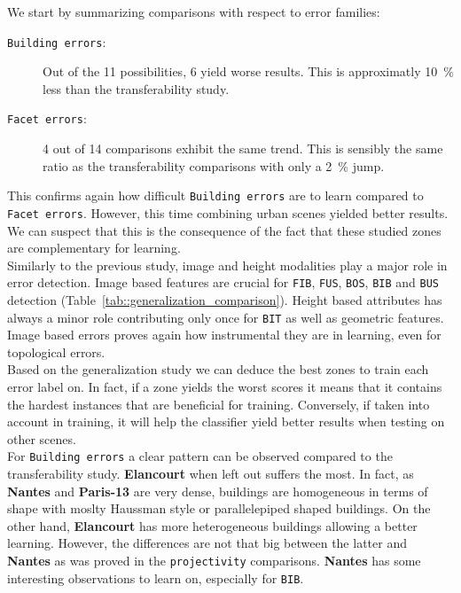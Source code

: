        We start by summarizing comparisons with respect to error families:
        \begin{description}
            \item[\texttt{Building errors}:] Out of the 11 possibilities, 6 yield worse results.
                    This is approximatly \SI{10}{\percent} less than the transferability study.
            \item[\texttt{Facet errors}:] 4 out of 14 comparisons exhibit the same trend.
                    This is sensibly the same ratio as the transferability comparisons with only a \SI{2}{\percent} jump.
        \end{description}
        This confirms again how difficult \texttt{Building errors} are to learn compared to \texttt{Facet errors}.
        However, this time combining urban scenes yielded better results.
        We can suspect that this is the consequence of the fact that these studied zones are complementary for learning.\\
        
        Similarly to the previous study, image and height modalities play a major role in error detection.
        Image based features are crucial for \texttt{FIB}, \texttt{FUS}, \texttt{BOS}, \texttt{BIB} and \texttt{BUS} detection (Table~\ref{tab::generalization_comparison}).
        Height based attributes has always a minor role contributing only once for \texttt{BIT} as well as geometric features.
        Image based errors proves again how instrumental they are in learning, even for topological errors.\\
        
        Based on the generalization study we can deduce the best zones to train each error label on.
        In fact, if a zone yields the worst scores it means that it contains the hardest instances that are beneficial for training.
        Conversely, if taken into account in training, it will help the classifier yield better results when testing on other scenes.\\

        For \texttt{Building errors} a clear pattern can be observed compared to the transferability study.
        \textbf{Elancourt} when left out suffers the most.
        In fact, as \textbf{Nantes} and \textbf{Paris-13} are very dense, buildings are homogeneous in terms of shape with moslty Haussman style or parallelepiped shaped buildings.
        On the other hand, \textbf{Elancourt} has more heterogeneous buildings allowing a better learning.
        However, the differences are not that big between the latter and \textbf{Nantes} as was proved in the \texttt{projectivity} comparisons.
        \textbf{Nantes} has some interesting observations to learn on, especially for \texttt{BIB}.\\

